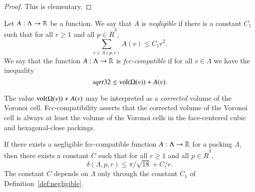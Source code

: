 \begin{proof}  This is elementary.
\end{proof}

\begin{definition}[negligible]\label{def:negligible}
Let $A:\Lambda\to{\mathbb R}$ be a function.  We say that $A$
is
  {\it negligible\/}
if there is a constant $C_1$ such that for all $r\ge1$ and all
$p\in\ring{R}^3$,
   $$\sum_{v\in\Lambda(p,r)} A(v) \le C_1 r^2.$$
We say that the function $A:\Lambda\to{\mathbb R}$ is
  {\it fcc-compatible\/}
if for all $v\in\Lambda$ we have the inequality
$$sqrt{32}\le {\operatorname{vol}}(\Omega(v)) + A(v).$$
\end{definition}





\begin{remark}
The value ${\operatorname{vol}}(\Omega(v)) + A(v)$ may be interpreted as a
{\it corrected\/} volume of the Voronoi
cell. Fcc-compatibility asserts that the corrected volume of the
Voronoi cell is always at least the volume of the Voronoi cells in
the face-centered cubic and hexagonal-close packings.
\end{remark}



\begin{lemma}
\label{lemma:deltabound} If there exists a 
negligible  fcc-compatible function
$A:\Lambda\to{\mathbb R}$ for a 
packing $\Lambda$, then there
exists a constant $C$ such that for all $r\ge1$ and all
$p\in\ring{R}^3$,
    $$
    \delta(\Lambda,p,r)
    \le \pi/\sqrt{18} + C/r.
    $$
The constant $C$ depends on $\Lambda$ only through the constant
$C_1$ of Definition~\ref{def:negligible}.
\end{lemma}



